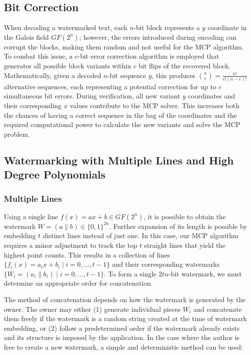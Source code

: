 \documentclass[a4paper,11pt]{llncs}
\begin{document}
\subsection{Bit Correction}
\label{apdxsec:bit_correction}
When decoding a watermarked text, each $n$-bit block represents a $y$ coordinate in the Galois field $GF(2^{n})$; however, the errors introduced during encoding can corrupt the blocks, making them random and not useful for the MCP algorithm. To combat this issue, a $c$-bit error correction algorithm is employed that generates all possible block variants within $c$ bit flips of the recovered block. Mathematically, given a decoded $n$-bit sequence $y$, this produces $\binom{n}{c} = \frac{n!}{c!(n-c)!}$ alternative sequences, each representing a potential correction for up to $c$ simultaneous bit errors. During verification, all new variant $y$ coordinates and their corresponding $x$ values contribute to the MCP solver. This increases both the chances of having a correct sequence in the bag of the coordinates and the required computational power to calculate the new variants and solve the MCP problem.


\subsection{Watermarking with Multiple Lines and High Degree Polynomials}\label{sec:multisecrets}
\subsubsection{Multiple Lines}
Using a single line $f(x)=ax+b\in GF(2^n)$, it is possible to obtain the watermark $W=(a\| b)\in \{0,1\}^{2n}$.
Further expansion of its length is possible by embedding $t$ distinct lines instead of just one. In this case, our MCP algorithm requires a minor adjustment to track the top $t$ straight lines that yield the highest point counts. This results in a collection of lines $\{f_i(x)=a_ix+b_i \;| \; i=0,\ldots,t-1\}$ and their corresponding watermarks $\{W_i=(a_i \|b_i)\; | \; i=0,\ldots,t-1\}$. To form a single $2tn$-bit watermark, we must determine an appropriate order for concatenation. 

The method of concatenation depends on how the watermark is generated by the owner. The owner may either (1) generate individual pieces $W_i$ and concatenate them freely if the watermark is a random string created at the time of watermark embedding, or (2) follow a predetermined order if the watermark already exists and its structure is imposed by the application.
In the case where the author is free to create a new watermark, a simple and deterministic method can be used:
\end{document}
